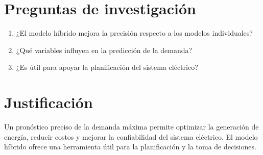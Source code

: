 \section*{Preguntas de investigación}

\begin{enumerate}
    \item ¿El modelo híbrido mejora la precisión respecto a los modelos individuales?
    \item ¿Qué variables influyen en la predicción de la demanda?
    \item ¿Es útil para apoyar la planificación del sistema eléctrico?
\end{enumerate}

\section*{Justificación}

Un pronóstico preciso de la demanda máxima permite optimizar la generación de energía, reducir costos y mejorar la confiabilidad del sistema eléctrico. El modelo híbrido ofrece una herramienta útil para la planificación y la toma de decisiones.
